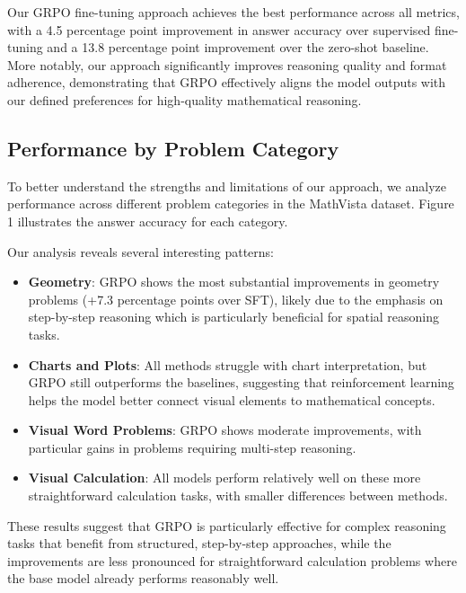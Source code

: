 \documentclass[11pt,a4paper]{article}
\begin{document}
Our GRPO fine-tuning approach achieves the best performance across all metrics, with a 4.5 percentage point improvement in answer accuracy over supervised fine-tuning and a 13.8 percentage point improvement over the zero-shot baseline. More notably, our approach significantly improves reasoning quality and format adherence, demonstrating that GRPO effectively aligns the model outputs with our defined preferences for high-quality mathematical reasoning.

\subsection{Performance by Problem Category}

To better understand the strengths and limitations of our approach, we analyze performance across different problem categories in the MathVista dataset. Figure 1 illustrates the answer accuracy for each category.


Our analysis reveals several interesting patterns:

\begin{itemize}
    \item \textbf{Geometry}: GRPO shows the most substantial improvements in geometry problems (+7.3 percentage points over SFT), likely due to the emphasis on step-by-step reasoning which is particularly beneficial for spatial reasoning tasks.
    \item \textbf{Charts and Plots}: All methods struggle with chart interpretation, but GRPO still outperforms the baselines, suggesting that reinforcement learning helps the model better connect visual elements to mathematical concepts.
    \item \textbf{Visual Word Problems}: GRPO shows moderate improvements, with particular gains in problems requiring multi-step reasoning.
    \item \textbf{Visual Calculation}: All models perform relatively well on these more straightforward calculation tasks, with smaller differences between methods.
\end{itemize}

These results suggest that GRPO is particularly effective for complex reasoning tasks that benefit from structured, step-by-step approaches, while the improvements are less pronounced for straightforward calculation problems where the base model already performs reasonably well.
\end{document}
